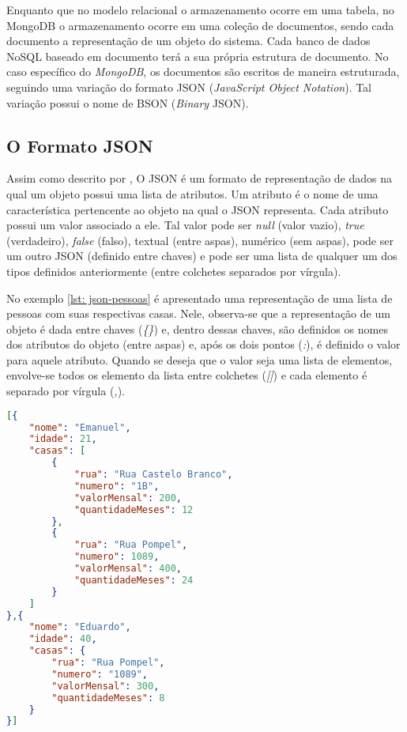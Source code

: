 Enquanto que no modelo relacional o armazenamento ocorre em uma tabela, no MongoDB o armazenamento ocorre em uma coleção de documentos, sendo cada documento a representação de um objeto do sistema. Cada banco de dados NoSQL baseado em documento terá a sua própria estrutura de documento. No caso específico do \textit{MongoDB}, os documentos são escritos de maneira estruturada, seguindo uma variação do formato JSON (\textit{JavaScript Object Notation}). Tal variação possui o nome de BSON (\textit{Binary} JSON).

\subsection{O Formato JSON}
    
Assim como descrito por , O JSON é um formato de representação de dados na qual um objeto possui uma lista de atributos. Um atributo é o nome de uma característica pertencente ao objeto na qual o JSON representa. Cada atributo possui um valor associado a ele. Tal valor pode ser \textit{null} (valor vazio), \textit{true} (verdadeiro), \textit{false} (falso), textual (entre aspas), numérico (sem aspas), pode ser um outro JSON (definido entre chaves) e pode ser uma lista de qualquer um dos tipos definidos anteriormente (entre colchetes separados por vírgula).

No exemplo \ref{lst: json-pessoas} é apresentado uma representação de uma lista de pessoas com suas respectivas casas. Nele, observa-se que a representação de um objeto é dada entre chaves (\textit{\{\}}) e, dentro dessas chaves, são definidos os nomes dos atributos do objeto (entre aspas) e, após os dois pontos (\textit{:}), é definido o valor para aquele atributo. Quando se deseja que o valor seja uma lista de elementos, envolve-se todos os elemento da lista entre colchetes (\textit{[]}) e cada elemento é separado por vírgula (\textit{,}).


\begin{lstlisting}[language=json, caption={JSON Representando Várias Pessoas Com Suas casas\label{lst: json-pessoas}}]
[{
    "nome": "Emanuel",
    "idade": 21,
    "casas": [
        {
            "rua": "Rua Castelo Branco",
            "numero": "1B",
            "valorMensal": 200,
            "quantidadeMeses": 12
        },
        {
            "rua": "Rua Pompel",
            "numero": 1089,
            "valorMensal": 400,
            "quantidadeMeses": 24
        }
    ]
},{
    "nome": "Eduardo",
    "idade": 40,
    "casas": {
        "rua": "Rua Pompel",
        "numero": "1089",
        "valorMensal": 300,
        "quantidadeMeses": 8
    }
}]
\end{lstlisting}
    

